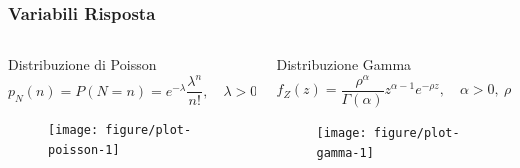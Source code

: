 \documentclass[pdf, aspectratio=169]{beamer}\usepackage[]{graphicx}\usepackage[]{color}
\newenvironment{knitrout}{}{} %
\theoremstyle{definition}
\begin{document}
\begin{frame}
\frametitle{Variabili Risposta}

\fontsize{9pt}{11pt}\selectfont

\begin{columns}[T]

\begin{column}{0.45\linewidth}
  \begin{block}{Distribuzione di Poisson}
    $$
    p_N(n) = P\left( N = n \right) = e^{-\lambda}\frac{\lambda^n}{n!}, \quad \lambda>0
    $$
  
    \begin{figure}
      \centering
\begin{knitrout}
\color{fgcolor}

{\centering \texttt{[image: figure/plot-poisson-1]} 

}



\end{knitrout}
      \label{fig:plot-poisson}
    \end{figure}

  \end{block}
\end{column}

\begin{column}{0.45\linewidth}
  \begin{block}{Distribuzione Gamma}
    $$
    f_Z(z) = \frac{\rho^\alpha}{\Gamma(\alpha)}z^{\alpha-1}e^{-\rho z}, \quad \alpha > 0, \ \rho > 0
    $$
    
    \begin{figure}
      \centering
\begin{knitrout}
\color{fgcolor}

{\centering \texttt{[image: figure/plot-gamma-1]} 

}



\end{knitrout}
      \label{fig:plot-gamma}
    \end{figure}

  \end{block}
\end{column}

\end{columns}

\end{frame}
\end{document}
